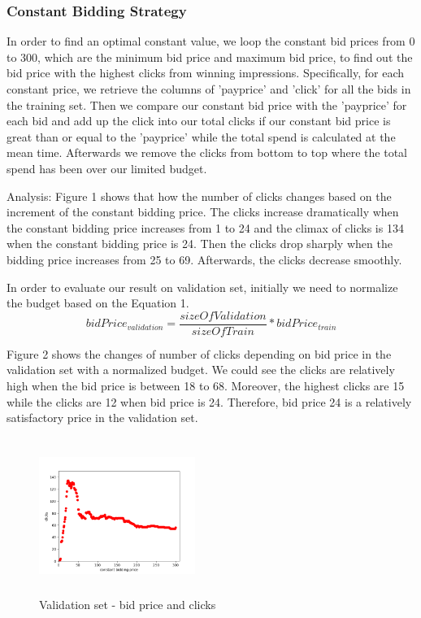 \documentclass{sig-alternate-05-2015}
\begin{document}
\subsubsection{Constant Bidding Strategy}
In order to find an optimal constant value, we loop the constant bid prices from 0 to 300, which are the minimum bid price and maximum bid price, to find out the bid price with the highest clicks from winning impressions. Specifically, for each constant price, we retrieve the columns of 'payprice' and 'click' for all the bids in the training set. Then we compare our constant bid price with the 'payprice' for each bid and add up the click into our total clicks if our constant bid price is great than or equal to the 'payprice' while the total spend is calculated at the mean time. Afterwards we remove the clicks from bottom to top where the total spend has been over our limited budget.

Analysis: 
Figure 1 shows that how the number of clicks changes based on the increment of the constant bidding price.
The clicks increase dramatically when the constant bidding price increases from 1 to 24 and the climax of clicks is 134 when the constant bidding price is 24. Then the clicks drop sharply when the bidding price increases from 25 to 69. Afterwards, the clicks decrease smoothly.

In order to evaluate our result on validation set, initially we need to normalize the budget based on the Equation 1.\\

\begin{equation}bidPrice_{validation}=\frac{sizeOfValidation}{sizeOfTrain} * bidPrice_{train}\end{equation}


Figure 2 shows the changes of number of clicks depending on bid price in the validation set with a normalized budget. We could see the clicks are relatively high when the bid price is between 18 to 68. Moreover, the highest clicks are 15 while the clicks are 12 when bid price is 24. Therefore, bid price 24 is a relatively satisfactory price in the validation set.

\begin{figure}
\centering
\includegraphics[height=2in, width=2in]{report/constant_bidding.png}
\caption{Validation set - bid price and clicks}
\end{figure}
\end{document}
